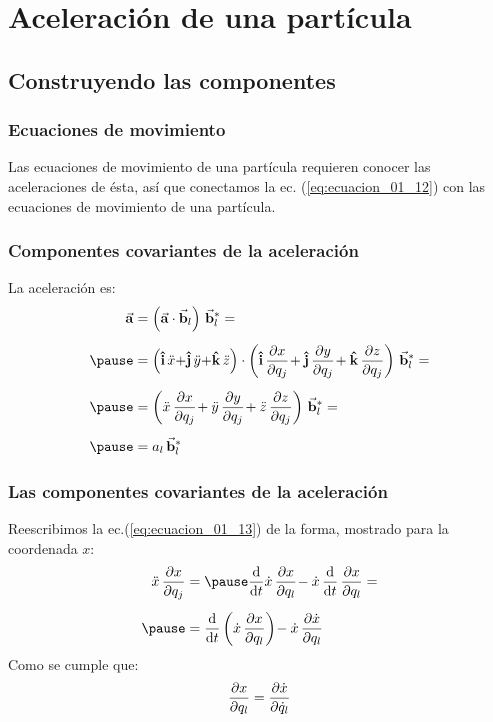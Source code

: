 \documentclass[12pt]{beamer}
\begin{document}
\section{Aceleración de una partícula}
\subsection{Construyendo las componentes}

\begin{frame}
\frametitle{Ecuaciones de movimiento}
Las ecuaciones de movimiento de una partícula requieren conocer las aceleraciones de ésta, así que conectamos la ec. (\ref{eq:ecuacion_01_12}) con las ecuaciones de movimiento de una partícula.
\end{frame}
\begin{frame}
\frametitle{Componentes covariantes de la aceleración}
La aceleración es:
\pause
\begin{equation}
\begin{aligned}[b]
\va{a} &= \left( \va{a} \cdot \va{b}_{l} \right) \, \va{b}_{l}^{*} = \\[0.5em] \pause
&= \left( \vu{i} \, \ddot{x} {+} \vu{j} \, \ddot{y} {+} \vu{k} \, \ddot{z} \right) \cdot \left( \vu{i} \, \pdv{x}{q_{j}} \!+ \vu{j} \, \pdv{y}{q_{j}} \!+ \vu{k} \, \pdv{z}{q_{j}} \right) \, \va{b}_{l}^{*} = \\[0.5em] \pause
&= \left( \ddot{x} \, \pdv{x}{q_{j}} \!+ \ddot{y} \, \pdv{y}{q_{j}} \!+ \ddot{z} \, \pdv{z}{q_{j}} \right) \, \va{b}_{l}^{*} = \\[0.5em] \pause
&= a_{l} \, \va{b}_{l}^{*}
\end{aligned}
\label{eq:ecuacion_01_13}
\end{equation}
\end{frame}
\begin{frame}
\frametitle{Las componentes covariantes de la aceleración}
Reescribimos la ec.(\ref{eq:ecuacion_01_13}) de la forma, mostrado para la coordenada $x$:
\pause
\begin{eqnarray*}
\begin{aligned}
\ddot{x} \, \pdv{x}{q_{j}} &= \pause \dv{t} \dot{x} \, \pdv{x}{q_{l}} \!- \dot{x} \, \dv{t} \, \pdv{x}{q_{l}} = \\[0.5em] \pause
&= \dv{t} \left( \dot{x} \, \pdv{x}{q_{l}} \right) \!- \dot{x} \, \pdv{\dot{x}}{q_{l}} 
\end{aligned}
\end{eqnarray*}
\pause
Como se cumple que:
\begin{align*}
\pdv{x}{q_{l}} = \pdv{\dot{x}}{\dot{q}_{l}}
\end{align*}
\end{frame}
\end{document}
